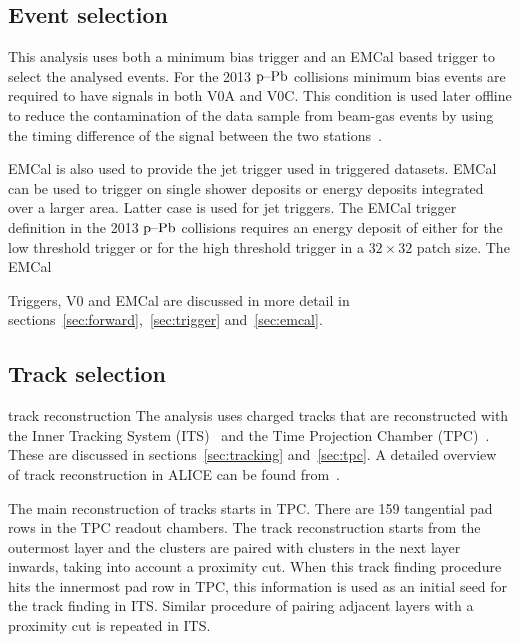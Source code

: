 \subsection{Event selection}
This analysis uses both a minimum bias trigger and an EMCal based trigger to select the analysed events. 
 For the 2013 $\mbox{p--Pb}$ collisions minimum bias events are required to have signals in both V0A and V0C. This condition is used later offline to reduce the contamination of the data sample from beam-gas events by using the timing difference of the signal between the two stations~\cite{alicePerformance}. 

EMCal is also used to provide the jet trigger used in triggered datasets. EMCal can be used to trigger on single shower deposits or energy deposits integrated over a larger area. Latter case is used for jet triggers. The EMCal trigger definition in the 2013 $\mbox{p--Pb}$ collisions requires an energy deposit of either \unit[10]{\gev}  for the low threshold trigger or \unit[20]{\gev} for the high threshold trigger in a $32\times32$ patch size. The EMCal 

Triggers, V0 and EMCal are discussed in more detail in sections~\ref{sec:forward},~\ref{sec:trigger} and~\ref{sec:emcal}. 

\subsection{Track selection}
{\color{red} track reconstruction}
The analysis uses charged tracks that are reconstructed with the Inner Tracking System (ITS)~\cite{aliceITS} and the Time Projection Chamber (TPC)~\cite{aliceTPC}. These are discussed in sections~\ref{sec:tracking} and~\ref{sec:tpc}. A detailed overview of track reconstruction in ALICE can be found from~\cite{alicePerformance}. 

The main reconstruction of tracks starts in TPC. There are 159 tangential pad rows in the TPC readout chambers. The track reconstruction starts from the outermost layer and the clusters are paired with clusters in the next layer inwards, taking into account a proximity cut. When this track finding procedure hits the innermost pad row in TPC, this information is used as an initial seed for the track finding in ITS. Similar procedure of pairing adjacent layers with a proximity cut is repeated in ITS.

